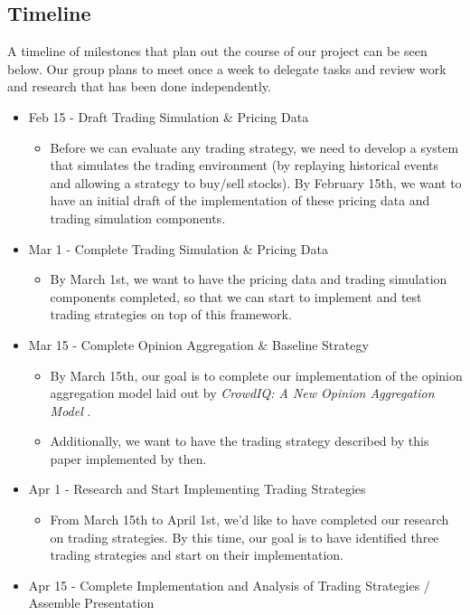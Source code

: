 \subsection{Timeline}

A timeline of milestones that plan out the course of our project can be seen below.
Our group plans to meet once a week to delegate tasks and review work and research that has been done independently.

\begin{itemize}
\item Feb 15 - Draft Trading Simulation \& Pricing Data
  \begin{itemize}
  \item Before we can evaluate any trading strategy, we need to develop a system that simulates the trading environment (by replaying historical events and allowing a strategy to buy/sell stocks).
    By February 15th, we want to have an initial draft of the implementation of these pricing data and trading simulation components.
  \end{itemize}
\item Mar 1 - Complete Trading Simulation \& Pricing Data
  \begin{itemize}
  \item By March 1st, we want to have the pricing data and trading simulation components completed, so that we can start to implement and test trading strategies on top of this framework.
  \end{itemize}
\item Mar 15 - Complete Opinion Aggregation \& Baseline Strategy
  \begin{itemize}
  \item By March 15th, our goal is to complete our implementation of the opinion aggregation model laid out by \textit{CrowdIQ: A New Opinion Aggregation Model} \cite{crowdiq}.
  \item Additionally, we want to have the trading strategy described by this paper implemented by then.
  \end{itemize}
\item Apr 1 - Research and Start Implementing Trading Strategies
  \begin{itemize}
  \item From March 15th to April 1st, we'd like to have completed our research on trading strategies.
    By this time, our goal is to have identified three trading strategies and start on their implementation.
  \end{itemize}
\item Apr 15 - Complete Implementation and Analysis of Trading Strategies / Assemble Presentation

\end{itemize}
